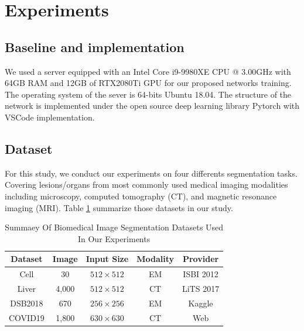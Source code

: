 \documentclass{ieeeaccess}
\begin{document}
\section{Experiments}
\subsection{Baseline and implementation}
We used a server equipped with an Intel Core i9-9980XE CPU @ 3.00GHz with 64GB RAM and 12GB of RTX2080Ti GPU for
our proposed networks training. The operating system of the sever is 64-bits Ubuntu 18.04. The structure of the network 
is implemented under the open source deep learning library Pytorch with VSCode implementation.

\subsection{Dataset}
For this study, we conduct our experiments on four differents segmentation tasks. 
Covering lesions/organs from most commonly used medical imaging modalities including microscopy, 
computed tomography (CT), and magnetic resonance imaging (MRI).  Table \ref{dataset-table} summarize those datasets in our study.

\begin{table}[htbp]
    \vspace{-2mm}
    \begin{center}\small
    \label{dataset-table}
    \begin{tabular}{ccccc}
      
    \toprule
    Dataset & Image & Input Size & Modality & Provider\\
    \midrule
    Cell & 30 & $512\times 512$  & EM      & ISBI 2012\cite{isbicell}   \\
    Liver    & 4,000 & $512\times 512$       & CT     & LiTS 2017\cite{liver}  \\
    DSB2018      & 670 & $256\times 256$      & EM      & Kaggle\cite{dsb2018} \\
    COVID19         & 1,800 & $630\times 630$     & CT     & Web\cite{covid19,covid19_2}  \\
  \bottomrule    
    \end{tabular}
    \caption{Summaey Of Biomedical Image Segmentation Datasets Used In Our Experiments}
  \end{center}
    \vspace{-4mm}
\end{table}
  
\end{document}
